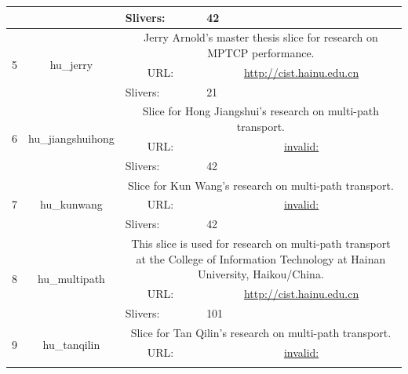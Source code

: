 \begin{small}
\begin{center}
\begin{longtable}{|c|c|c|c|}
  &  & \multicolumn{1}{|l|}{Slivers:} & \multicolumn{1}{|l|}{42} \\ \hline
 \multirow{3}{*}{5} & \multirow{3}{*}{\index{hu\_jerry}\index{Slice!hu\_jerry}hu\_jerry} & \multicolumn{2}{|p{30em}|}{Jerry Arnold's master thesis slice for research on MPTCP performance.} \\* \cline{3-3}\cline{4-4}
  &  & \multicolumn{1}{|p{5em}|}{URL:} & \multicolumn{1}{|p{22.5em}|}{\url{http://cist.hainu.edu.cn}} \\* \cline{3-3}\cline{4-4}
  &  & \multicolumn{1}{|l|}{Slivers:} & \multicolumn{1}{|l|}{21} \\ \hline
 \multirow{3}{*}{6} & \multirow{3}{*}{\index{hu\_jiangshuihong}\index{Slice!hu\_jiangshuihong}hu\_jiangshuihong} & \multicolumn{2}{|p{30em}|}{Slice for Hong Jiangshui's research on multi-path transport.} \\* \cline{3-3}\cline{4-4}
  &  & \multicolumn{1}{|p{5em}|}{URL:} & \multicolumn{1}{|p{22.5em}|}{\url{invalid:}} \\* \cline{3-3}\cline{4-4}
  &  & \multicolumn{1}{|l|}{Slivers:} & \multicolumn{1}{|l|}{42} \\ \hline
 \multirow{3}{*}{7} & \multirow{3}{*}{\index{hu\_kunwang}\index{Slice!hu\_kunwang}hu\_kunwang} & \multicolumn{2}{|p{30em}|}{Slice for Kun Wang's research on multi-path transport.} \\* \cline{3-3}\cline{4-4}
  &  & \multicolumn{1}{|p{5em}|}{URL:} & \multicolumn{1}{|p{22.5em}|}{\url{invalid:}} \\* \cline{3-3}\cline{4-4}
  &  & \multicolumn{1}{|l|}{Slivers:} & \multicolumn{1}{|l|}{42} \\ \hline
 \multirow{3}{*}{8} & \multirow{3}{*}{\index{hu\_multipath}\index{Slice!hu\_multipath}hu\_multipath} & \multicolumn{2}{|p{30em}|}{This slice is used for research on multi-path transport at the College of Information Technology at Hainan University, Haikou/China.} \\* \cline{3-3}\cline{4-4}
  &  & \multicolumn{1}{|p{5em}|}{URL:} & \multicolumn{1}{|p{22.5em}|}{\url{http://cist.hainu.edu.cn}} \\* \cline{3-3}\cline{4-4}
  &  & \multicolumn{1}{|l|}{Slivers:} & \multicolumn{1}{|l|}{101} \\ \hline
 \multirow{3}{*}{9} & \multirow{3}{*}{\index{hu\_tanqilin}\index{Slice!hu\_tanqilin}hu\_tanqilin} & \multicolumn{2}{|p{30em}|}{Slice for Tan Qilin's research on multi-path transport.} \\* \cline{3-3}\cline{4-4}
  &  & \multicolumn{1}{|p{5em}|}{URL:} & \multicolumn{1}{|p{22.5em}|}{\url{invalid:}} \\* \cline{3-3}\cline{4-4}

\end{longtable}
\end{center}
\end{small}
